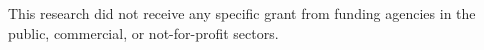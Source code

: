 This research did not receive any specific grant from funding agencies in the public, commercial, or not-for-profit sectors.
